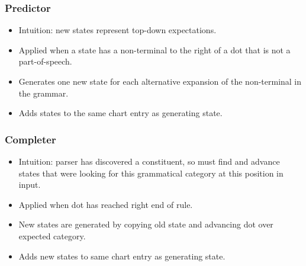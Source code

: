 \begin{frame}[fragile]
  \frametitle{Predictor}



\begin{itemize}
\item Intuition: new states represent top-down expectations.
\item Applied when a state has a non-terminal to the right of a dot that
  is not a part-of-speech.
\item Generates one new state for each alternative expansion of the
  non-terminal in the grammar.
\item Adds states to the same chart entry as generating state.
\end{itemize}

\end{frame}


\begin{frame}[fragile]
  \frametitle{Completer}



\begin{itemize}
\item Intuition: parser has discovered a constituent, so must find and
  advance states that were looking for this grammatical category at this
  position in input.
\item Applied when dot has reached right end of rule.
\item New states are generated by copying old state and advancing dot
  over expected category.
\item Adds new states to same chart entry as generating state.
\end{itemize}

\end{frame}

